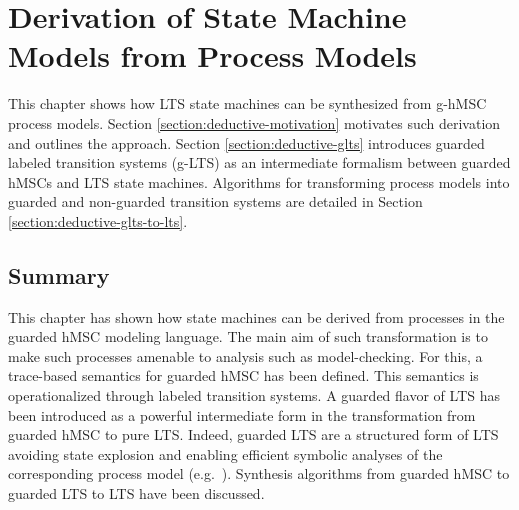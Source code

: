 \chapter{Derivation of State Machine Models from Process Models\label{chapter:deductive}}

This chapter shows how LTS state machines can be synthesized from g-hMSC process models. Section \ref{section:deductive-motivation} motivates such derivation and outlines the approach. Section \ref{section:deductive-glts} introduces guarded labeled transition systems (g-LTS) as an intermediate formalism between guarded hMSCs and LTS state machines. Algorithms for transforming process models into guarded and non-guarded transition systems are detailed in Section \ref{section:deductive-glts-to-lts}.





\section*{Summary}

This chapter has shown how state machines can be derived from processes in the guarded hMSC modeling language. The main aim of such transformation is to make such processes amenable to analysis such as model-checking. For this, a trace-based semantics for guarded hMSC has been defined. This semantics is operationalized through labeled transition systems. A guarded flavor of LTS has been introduced as a powerful intermediate form in the transformation from guarded hMSC to pure LTS. Indeed, guarded LTS are a structured form of LTS avoiding state explosion and enabling efficient symbolic analyses of the corresponding process model (e.g.~\cite{Damas:2011}). Synthesis algorithms from guarded hMSC to guarded LTS to LTS have been discussed.
